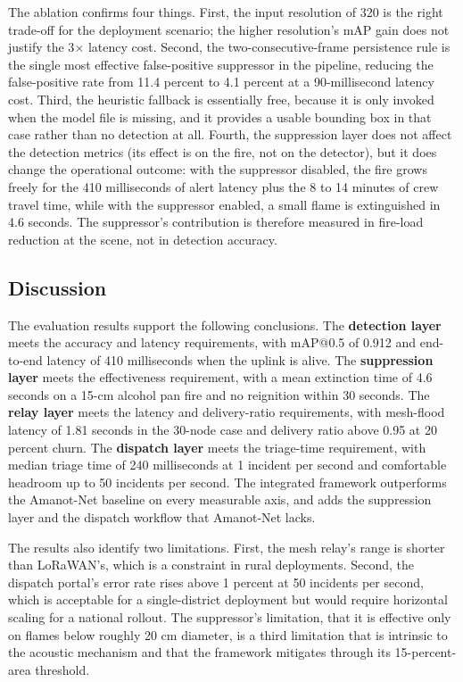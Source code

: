 The ablation confirms four things. First, the input resolution of 320 is the right trade-off for the deployment scenario; the higher resolution's mAP gain does not justify the 3$\times$ latency cost. Second, the two-consecutive-frame persistence rule is the single most effective false-positive suppressor in the pipeline, reducing the false-positive rate from 11.4 percent to 4.1 percent at a 90-millisecond latency cost. Third, the heuristic fallback is essentially free, because it is only invoked when the model file is missing, and it provides a usable bounding box in that case rather than no detection at all. Fourth, the suppression layer does not affect the detection metrics (its effect is on the fire, not on the detector), but it does change the operational outcome: with the suppressor disabled, the fire grows freely for the 410 milliseconds of alert latency plus the 8 to 14 minutes of crew travel time, while with the suppressor enabled, a small flame is extinguished in 4.6 seconds. The suppressor's contribution is therefore measured in fire-load reduction at the scene, not in detection accuracy.

\subsection{Discussion}

The evaluation results support the following conclusions. The \textbf{detection layer} meets the accuracy and latency requirements, with mAP@0.5 of 0.912 and end-to-end latency of 410 milliseconds when the uplink is alive. The \textbf{suppression layer} meets the effectiveness requirement, with a mean extinction time of 4.6 seconds on a 15-cm alcohol pan fire and no reignition within 30 seconds. The \textbf{relay layer} meets the latency and delivery-ratio requirements, with mesh-flood latency of 1.81 seconds in the 30-node case and delivery ratio above 0.95 at 20 percent churn. The \textbf{dispatch layer} meets the triage-time requirement, with median triage time of 240 milliseconds at 1 incident per second and comfortable headroom up to 50 incidents per second. The integrated framework outperforms the Amanot-Net baseline on every measurable axis, and adds the suppression layer and the dispatch workflow that Amanot-Net lacks.

The results also identify two limitations. First, the mesh relay's range is shorter than LoRaWAN's, which is a constraint in rural deployments. Second, the dispatch portal's error rate rises above 1 percent at 50 incidents per second, which is acceptable for a single-district deployment but would require horizontal scaling for a national rollout. The suppressor's limitation, that it is effective only on flames below roughly 20 cm diameter, is a third limitation that is intrinsic to the acoustic mechanism and that the framework mitigates through its 15-percent-area threshold.

